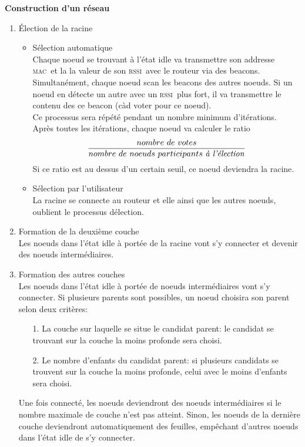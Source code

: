 \documentclass[a4paper, 12pt]{report}
\newcommand{\mac}{\textsc{mac}}
\newcommand{\rssi}{\textsc{rssi}}
\begin{document}
    \textbf{Construction d'un réseau}
    \newline
    \begin{enumerate}
        \item \'Election de la racine
            \begin{itemize}
                \item Sélection automatique\\
                    Chaque noeud se trouvant à l'état idle va transmettre son addresse \mac\ et la
                    la valeur de son \rssi\ avec le routeur via des beacons.\\
                    Simultanément, chaque noeud scan les beacons des autres noeuds. Si un noeud
                    en détecte un autre avec un \rssi\ plus fort, il va transmettre le contenu des
                    ce beacon (càd voter pour ce noeud).\\
                    Ce processus sera répété pendant un nombre minimum d'itérations.\\
                    Après toutes les itérations, chaque noeud va calculer le ratio
                    \[\frac{nombre\ de\ votes}{nombre\ de\ noeuds\ participants\ \textrm{\textit{à l'élection}}}\]
                    Si ce ratio est au dessus d'un certain seuil, ce noeud deviendra la racine.

                \item Sélection par l'utilisateur\\
                    La racine se connecte au routeur et elle ainsi que les autres noeuds, oublient le processus
                    délection.
            \end{itemize}
        \item Formation de la deuxième couche\\
            Les noeuds dans l'état idle à portée de la racine vont s'y connecter et devenir des noeuds intermédiaires.
        
        \item Formation des autres couches\\
            Les noeuds dans l'état idle à portée de noeuds intermédiaires vont s'y connecter. Si plusieurs parents
            sont possibles, un noeud choisira son parent selon deux critères:
            \begin{enumerate}
                \addtolength{\itemindent}{1cm}
                \item[1.] La couche sur laquelle se situe le candidat parent:
                    le candidat se trouvant sur la couche la moins profonde sera choisi. 
                \item[2.] Le nombre d'enfants du candidat parent: si plusieurs candidats se trouvent
                    sur la couche la moins profonde, celui avec le moins d'enfants sera choisi. 
            \end{enumerate}
            Une fois connecté, les noeuds deviendront des noeuds intermédiaires si le nombre maximale de couche n'est pas atteint.
            Sinon, les noeuds de la dernière couche deviendront automatiquement
            des feuilles, empêchant d'autres noeuds dans l'état idle de s'y connecter.

    \end{enumerate}
\end{document}
